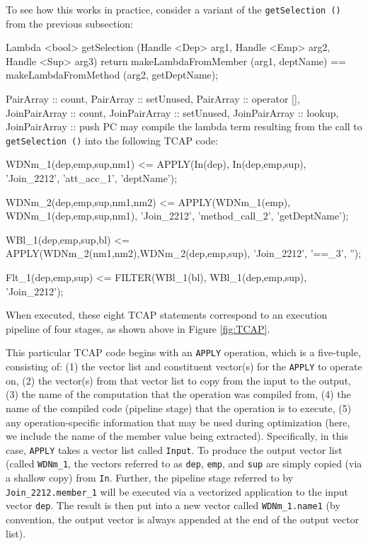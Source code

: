 To see how this works in practice, consider a variant of the \texttt{getSelection ()} from the previous subsection:

\begin{codesmall} 
Lambda <bool> getSelection (Handle <Dep> arg1, Handle <Emp> arg2, Handle <Sup> arg3) {
	return makeLambdaFromMember (arg1, deptName) == 
	       makeLambdaFromMethod (arg2, getDeptName); 
}
\end{codesmall}

PairArray :: count, PairArray :: setUnused, PairArray :: operator [], JoinPairArray :: count, JoinPairArray :: setUnused, JoinPairArray :: lookup, JoinPairArray :: push
\noindent PC may compile the lambda term resulting from the call to \texttt{getSelection ()} into the following TCAP code:

\begin{codesmall}
WDNm_1(dep,emp,sup,nm1) <= 
  APPLY(In(dep), In(dep,emp,sup), 'Join_2212', 'att_acc_1', 'deptName');

WDNm_2(dep,emp,sup,nm1,nm2) <= 
   APPLY(WDNm_1(emp), WDNm_1(dep,emp,sup,nm1), 'Join_2212', 'method_call_2', 'getDeptName');

WBl_1(dep,emp,sup,bl) <= 
   APPLY(WDNm_2(nm1,nm2),WDNm_2(dep,emp,sup), 'Join_2212', '==_3', '');

Flt_1(dep,emp,sup) <= FILTER(WBl_1(bl), WBl_1(dep,emp,sup), 'Join_2212');
\end{codesmall}

\noindent
When executed, these eight TCAP statements correspond to an execution pipeline of four stages,
as shown above in Figure \ref{fig:TCAP}.

This particular TCAP code begins with an \texttt{APPLY} operation, which is a five-tuple, consisting of: (1) the vector list and constituent
vector(s) for the \texttt{APPLY} to operate on, (2) the vector(s) from that vector list to copy
from the input to the output, (3) the name of the computation that the operation was compiled from, (4) the name of the compiled code (pipeline stage)
that the operation is to execute,
(5) any operation-specific information that may be used during optimization (here, we include the name of the member value being extracted).
Specifically, in this case, \texttt{APPLY} takes
a vector list called \texttt{Input}.  To produce the output vector list (called \texttt{WDNm\_1}, the vectors referred to
as \texttt{dep}, \texttt{emp}, and \texttt{sup} are simply copied (via a shallow copy) from \texttt{In}.
Further, the pipeline stage referred to by \texttt{Join\_2212.member\_1} will be executed via a vectorized application to the input
vector \texttt{dep}.  The result is then put into a new vector called 
\texttt{WDNm\_1.name1} (by convention, the output vector is always appended at the end of the output vector list).

